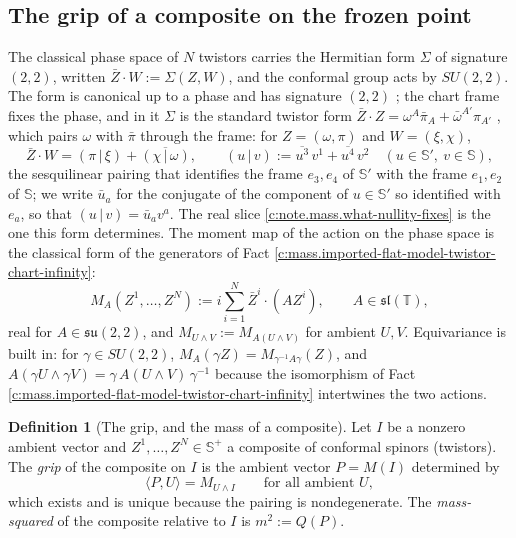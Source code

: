 \documentclass[11pt]{article}
\theoremstyle{definition}
\newtheorem{definition}[theorem]{Definition}
\theoremstyle{plain}
\newcommand{\changedmark}[2]{\marginpar{\raggedright\scriptsize\color{#1}#2}}
\providecommand{\CS}{}\renewcommand{\CS}{{\mathbb{S}^{+}}}
\providecommand{\Sc}{}\renewcommand{\Sc}{\mathbb{S}}
\providecommand{\T}{}\renewcommand{\T}{\mathbb{T}}
\providecommand{\hp}{}\renewcommand{\hp}[2]{( #1 \,|\, #2 )}
\providecommand{\ip}{}\renewcommand{\ip}[2]{\langle #1, #2\rangle}
\begin{document}
\subsection*{The grip of a composite on the frozen point}
\label{c:note.mass.setting-grip-composite-frozen-point}
The classical phase space of $N$ twistors carries the Hermitian form $\Sigma$ of signature $(2,2)$, written $\bar{Z}\cdot W := \Sigma(Z, W)$, and the conformal group acts by $SU(2,2)$. The form is canonical up to a phase and has signature $(2,2)$ \cite[Prop.~4.5(1), (2), (4)]{ButlerT9}; the chart frame fixes the phase, and in it $\Sigma$ is the standard twistor form $\bar{Z}\cdot Z = \omega^{A}\bar\pi_{A} + \bar\omega^{A'}\pi_{A'}$ \cite{PenroseRindler1986}, which pairs $\omega$ with $\bar\pi$ through the frame: for $Z = (\omega, \pi)$ and $W = (\xi, \chi)$,
\begin{equation}
\bar{Z}\cdot W = \hp{\pi}{\xi} + \overline{\hp{\chi}{\omega}}, \qquad \hp{u}{v} := \overline{u^{3}}\,v^{1} + \overline{u^{4}}\,v^{2}\quad (u \in \Sc',\ v \in \Sc),
\end{equation}
the sesquilinear pairing that identifies the frame $e_{3}, e_{4}$ of $\Sc'$ with the frame $e_{1}, e_{2}$ of $\Sc$; we write $\bar{u}_{a}$ for the conjugate of the component of $u \in \Sc'$ so identified with $e_{a}$, so that $\hp{u}{v} = \bar{u}_{a}v^{a}$. The real slice \ref{c:note.mass.what-nullity-fixes} is the one this form determines. The moment map of the action on the phase space is the classical form of the generators of Fact \ref{c:mass.imported-flat-model-twistor-chart-infinity}:
\begin{equation}
M_{A}(Z^{1}, \dots, Z^{N}) := i\sum_{i=1}^{N} \bar{Z}^{i}\cdot(A Z^{i}), \qquad A \in \mathfrak{sl}(\T),
\end{equation}
real for $A \in \mathfrak{su}(2,2)$, and $M_{U\wedge V} := M_{A(U\wedge V)}$ for ambient $U, V$. Equivariance is built in: for $\gamma \in SU(2,2)$, $M_{A}(\gamma Z) = M_{\gamma^{-1}A\gamma}(Z)$, and $A(\gamma U \wedge \gamma V) = \gamma\,A(U\wedge V)\,\gamma^{-1}$ because the isomorphism of Fact \ref{c:mass.imported-flat-model-twistor-chart-infinity} intertwines the two actions.

\begin{definition}[The grip, and the mass of a composite]\label{c:obj.mass.grip-mass-composite}
\changedmark{gray}{reworded}
Let $I$ be a nonzero ambient vector and $Z^{1}, \dots, Z^{N} \in \CS$ a composite of conformal spinors (twistors). The \emph{grip} of the composite on $I$ is the ambient vector $P = M(I)$ determined by
\[
\ip{P}{U} = M_{U\wedge I} \qquad\text{for all ambient } U,
\]
which exists and is unique because the pairing is nondegenerate. The \emph{mass-squared} of the composite relative to $I$ is $m^{2} := Q(P)$.
\end{definition}
\end{document}
